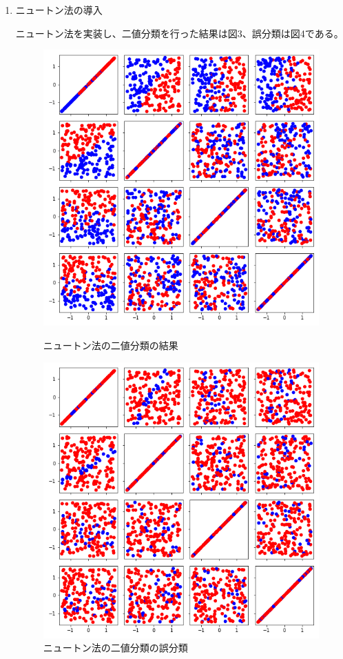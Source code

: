 \documentclass{jsarticle}
\begin{document}
\begin{enumerate}
  \item ニュートン法の導入
  
  ニュートン法を実装し、二値分類を行った結果は図3、誤分類は図4である。
  \begin{figure}[htbp]
    \centering
    \begin{minipage}{.4\linewidth}
      \centering
      \includegraphics[width=.9\textwidth]{image/1-2-1.png}
      \caption{ニュートン法の二値分類の結果}
    \end{minipage}
    \begin{minipage}{.4\linewidth}
      \centering
      \includegraphics[width=.9\textwidth]{image/1-2-2.png}
      \caption{ニュートン法の二値分類の誤分類}
    \end{minipage}
  \end{figure}
  

\end{enumerate}
\end{document}
